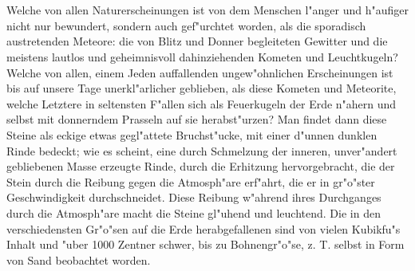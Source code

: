 \documentclass[a4paper, 11pt, oneside]{article}
\begin{document}
\section{}
\paragraph{}
Welche von allen Naturerscheinungen ist von dem Menschen l"anger und h"aufiger nicht nur bewundert, sondern auch gef"urchtet worden, als die sporadisch austretenden Meteore: die von Blitz und Donner begleiteten Gewitter und die meistens lautlos und geheimnisvoll dahinziehenden Kometen und Leuchtkugeln? Welche von allen, einem Jeden auffallenden ungew"ohnlichen Erscheinungen ist bis auf unsere Tage unerkl"arlicher geblieben, als diese Kometen und Meteorite, welche Letztere in seltensten F"allen sich als Feuerkugeln der Erde n"ahern und selbst mit donnerndem Prasseln auf sie herabst"urzen? Man findet dann diese Steine als eckige etwas gegl"attete Bruchst"ucke, mit einer d"unnen dunklen Rinde bedeckt; wie es scheint, eine durch Schmelzung der inneren, unver"andert gebliebenen Masse erzeugte Rinde, durch die Erhitzung hervorgebracht, die der Stein durch die Reibung gegen die Atmosph"are erf"ahrt, die er in gr"o"ster Geschwindigkeit durchschneidet. Diese Reibung w"ahrend ihres Durchganges durch die Atmosph"are macht die Steine gl"uhend und leuchtend. Die in den verschiedensten Gr"o"sen auf die Erde herabgefallenen sind von vielen Kubikfu"s Inhalt und "uber 1000 Zentner schwer, bis zu Bohnengr"o"se, z. T. selbst in Form von Sand beobachtet worden.
\end{document}
